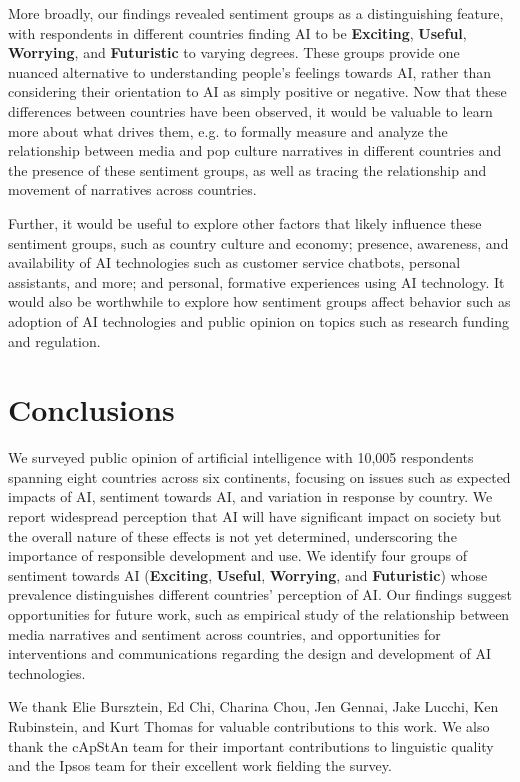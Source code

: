 \documentclass[sigconf]{acmart}
\def\Exciting/{{\fontfamily{lmss}\selectfont\textbf{Exciting}}}  \def\Useful/{{\fontfamily{lmss}\selectfont\textbf{Useful}}}
\def\Worrying/{{\fontfamily{lmss}\selectfont\textbf{Worrying}}}
\def\Futuristic/{{\fontfamily{lmss}\selectfont\textbf{Futuristic}}}
\begin{document}
More broadly, our findings revealed sentiment groups as a distinguishing feature, with respondents in different countries finding AI to be \Exciting/, \Useful/, \Worrying/, and \Futuristic/ to varying degrees. These groups provide one nuanced alternative to understanding people's feelings towards AI, rather than considering their orientation to AI as simply positive or negative. 
Now that these differences between countries have been observed, it would be valuable to learn more about what drives them, e.g. to formally measure and analyze the relationship between media and pop culture narratives in different countries and the presence of these sentiment groups, as well as tracing the relationship and movement of narratives across countries.

Further, it would be useful to explore other factors that likely influence these sentiment groups, such as country culture and economy; presence, awareness, and availability of AI technologies such as customer service chatbots, personal assistants, and more; and personal, formative experiences using AI technology. It would also be worthwhile to explore how sentiment groups affect behavior such as adoption of AI technologies and public opinion on topics such as research funding and regulation. 
\section{Conclusions}
We surveyed public opinion of artificial intelligence with 10,005 respondents spanning eight countries across six continents, focusing on issues such as expected impacts of AI, sentiment towards AI, and variation in response by country. We report widespread perception that AI will have significant impact on society but the overall nature of these effects is not yet determined, underscoring the importance of responsible development and use. We identify four groups of sentiment towards AI (\Exciting/, \Useful/, \Worrying/, and \Futuristic/) whose prevalence distinguishes different countries' perception of AI. Our findings suggest opportunities for future work, such as empirical study of the relationship between media narratives and sentiment across countries, and opportunities for interventions and communications regarding the design and development of AI technologies.

\begin{acks}
We thank Elie Bursztein, Ed Chi, Charina Chou, Jen Gennai, Jake Lucchi, Ken Rubinstein, and Kurt Thomas for valuable contributions to this work.
We also thank the cApStAn team for their important contributions to linguistic quality and the Ipsos team for their excellent work fielding the survey.
\end{acks}
\end{document}
